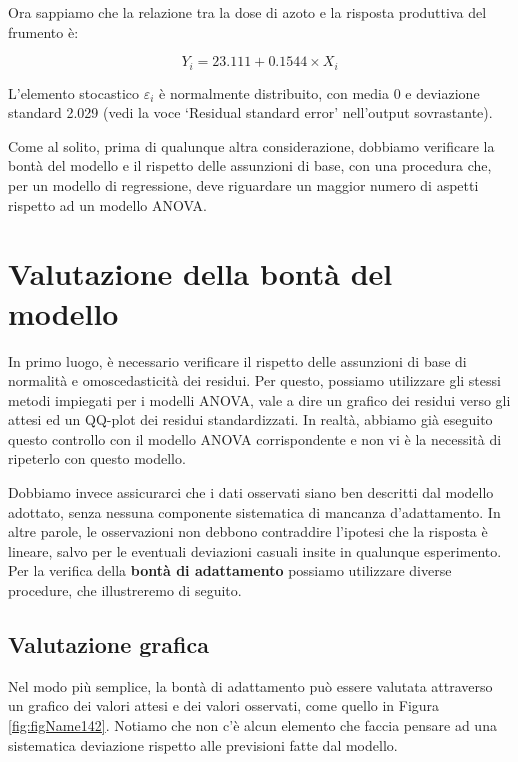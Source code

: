 \documentclass[a4paper,12pt,oneside]{book}
\begin{document}
Ora sappiamo che la relazione tra la dose di azoto e la risposta produttiva del frumento è:

\[ Y_i = 23.111 + 0.1544 \times X_i \]

L'elemento stocastico \(\varepsilon_i\) è normalmente distribuito, con media 0 e deviazione standard 2.029 (vedi la voce `Residual standard error' nell'output sovrastante).

Come al solito, prima di qualunque altra considerazione, dobbiamo verificare la bontà del modello e il rispetto delle assunzioni di base, con una procedura che, per un modello di regressione, deve riguardare un maggior numero di aspetti rispetto ad un modello ANOVA.

\hypertarget{valutazione-della-bontuxe0-del-modello}{%
\section{Valutazione della bontà del modello}\label{valutazione-della-bontuxe0-del-modello}}

In primo luogo, è necessario verificare il rispetto delle assunzioni di base di normalità e omoscedasticità dei residui. Per questo, possiamo utilizzare gli stessi metodi impiegati per i modelli ANOVA, vale a dire un grafico dei residui verso gli attesi ed un QQ-plot dei residui standardizzati. In realtà, abbiamo già eseguito questo controllo con il modello ANOVA corrispondente e non vi è la necessità di ripeterlo con questo modello.

Dobbiamo invece assicurarci che i dati osservati siano ben descritti dal modello adottato, senza nessuna componente sistematica di mancanza d'adattamento. In altre parole, le osservazioni non debbono contraddire l'ipotesi che la risposta è lineare, salvo per le eventuali deviazioni casuali insite in qualunque esperimento. Per la verifica della \textbf{bontà di adattamento} possiamo utilizzare diverse procedure, che illustreremo di seguito.

\hypertarget{valutazione-grafica}{%
\subsection{Valutazione grafica}\label{valutazione-grafica}}

Nel modo più semplice, la bontà di adattamento può essere valutata attraverso un grafico dei valori attesi e dei valori osservati, come quello in Figura \ref{fig:figName142}. Notiamo che non c'è alcun elemento che faccia pensare ad una sistematica deviazione rispetto alle previsioni fatte dal modello.
\end{document}
